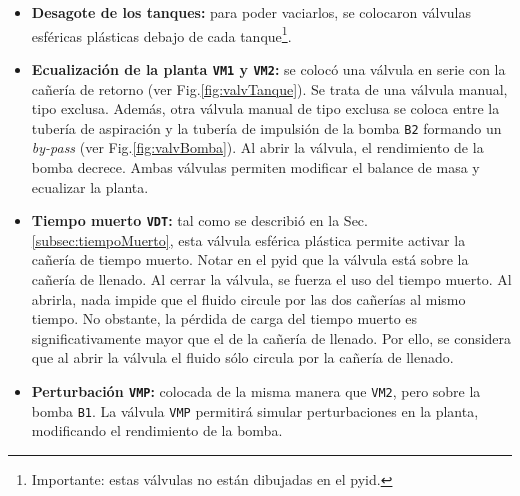 \begin{itemize}
  \item \textbf{Desagote de los tanques:}
  para poder vaciarlos, se colocaron válvulas esféricas plásticas debajo de
cada tanque\footnote{Importante: estas válvulas no están dibujadas en el
\gls{pyid}.}.

  \item \textbf{Ecualización de la planta \texttt{VM1} y \texttt{VM2}:} se
colocó una válvula en serie con la cañería de retorno (ver
Fig.\ref{fig:valvTanque}).
Se trata de una
válvula manual, tipo exclusa.
Además, otra válvula manual de tipo exclusa se coloca entre la tubería de
aspiración y
la tubería de impulsión de la bomba \verb|B2| formando un \emph{by-pass} (ver
Fig.\ref{fig:valvBomba}).
Al abrir la válvula, el rendimiento de la bomba decrece.
  Ambas válvulas permiten modificar el balance de masa y ecualizar la planta.

  \item \textbf{Tiempo muerto \texttt{VDT}:}
  tal como se describió en la Sec. \ref{subsec:tiempoMuerto}, esta válvula
esférica plástica permite activar la cañería de tiempo muerto.
  Notar en el \gls{pyid} que la válvula está sobre la cañería de llenado.
  Al cerrar la válvula, se fuerza el uso del tiempo muerto.
  Al abrirla, nada impide que el fluido circule por las dos cañerías al mismo
tiempo.
  No obstante, la pérdida de carga del tiempo muerto es significativamente
mayor que el de la cañería de llenado.
  Por ello, se considera que al abrir la válvula  el fluido sólo circula
por la cañería de llenado.

  \item \textbf{Perturbación \texttt{VMP}:}
  colocada de la misma manera que \verb|VM2|, pero sobre la bomba \verb|B1|.
  La válvula \verb|VMP| permitirá simular perturbaciones en la planta,
modificando el rendimiento de la bomba.

\end{itemize}


